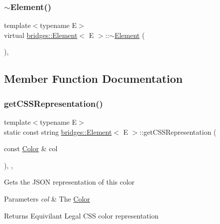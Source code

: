 \subsubsection{\texorpdfstring{$\sim$\+Element()}{~Element()}}
{\footnotesize\ttfamily template$<$typename E$>$ \\
virtual \mbox{\hyperlink{classbridges_1_1_element}{bridges\+::\+Element}}$<$ E $>$\+::$\sim$\mbox{\hyperlink{classbridges_1_1_element}{Element}} (\begin{DoxyParamCaption}{ }\end{DoxyParamCaption})\hspace{0.3cm}{\ttfamily [inline]}, {\ttfamily [virtual]}}



\subsection{Member Function Documentation}
\mbox{\label{classbridges_1_1_element_a513b3409e4b689a390b0dcd50cc2d643}} 
\subsubsection{\texorpdfstring{get\+C\+S\+S\+Representation()}{getCSSRepresentation()}}
{\footnotesize\ttfamily template$<$typename E$>$ \\
static const string \mbox{\hyperlink{classbridges_1_1_element}{bridges\+::\+Element}}$<$ E $>$\+::get\+C\+S\+S\+Representation (\begin{DoxyParamCaption}\item[{const \mbox{\hyperlink{classbridges_1_1_color}{Color}} \&}]{col }\end{DoxyParamCaption})\hspace{0.3cm}{\ttfamily [inline]}, {\ttfamily [static]}, {\ttfamily [protected]}}

Gets the J\+S\+ON representation of this color


\begin{DoxyParams}{Parameters}
{\em col} & The \mbox{\hyperlink{classbridges_1_1_color}{Color}} \\
\hline
\end{DoxyParams}
\begin{DoxyReturn}{Returns}
Equivilant Legal C\+SS color representation 
\end{DoxyReturn}
\mbox{\label{classbridges_1_1_element_abfea1b7226b774be648e15f6b2c9daba}} 
